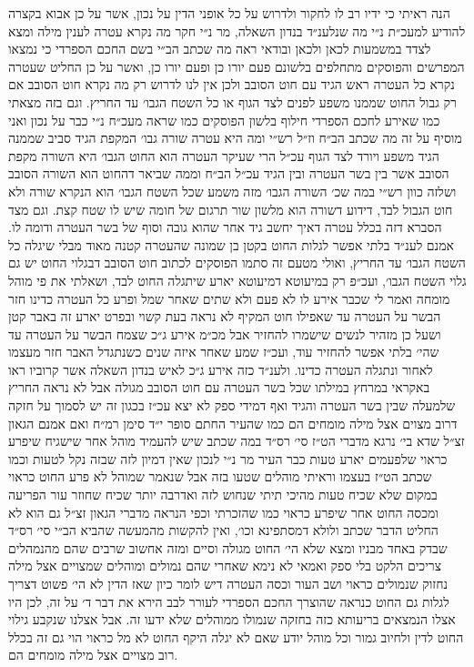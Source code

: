 \documentclass[12pt, openany]{book}
\begin{document}
\begin{multicols}{2}
הנה ראיתי כי ידיו רב לו לחקור ולדרוש על כל אופני הדין על נכון, אשר על כן אבוא בקצרה להודיע למעכ״ת נ״י מה שנלענ״ד בנדון השאלה, מר נ״י חקר מה נקרא עטרה לענין מילה ומצא לצדד במשמעות לכאן ולכאן ובודאי ראה מה שכתב הב״י בשם החכם הספרדי כי נמצאו המפרשים והפוסקים מתחלפים בלשונם פעם יורו כן ופעם יורו כן, ואשר על כן החליט שעטרה נקרא כל העטרה ראש הגיד עם חוט הסובב ולכן אין לנו לדרוש רק מה נקרא חוט הסובב אם רק גבול החוט שממנו משפע לפנים לצד הגוף או כל השטח הגבו׳ עד החריץ. וגם בזה מצאתי כמו שאירע לחכם הספרדי חילוף בלשון הפוסקים כמו שראה מעכ״ח נ״י כבר על נכון ואני מוסיף על זה מה שכתב הב״ח וז״ל רש״י ומה היא עטרה שורה גבו׳ המקפת הגיד סביב שממנה הגיד משפע ויורד לצד הגוף עכ״ל הרי שעיקר העטרה הוא החוט הגבו׳ היא השורה מקפת הסובב אשר בין בשר העטרה ובין הגיד עכ״ל הב״ח וממה שביאר דהחוט הוא השורה הסובב ושלזה כוון רש״י במה שכ׳ השורה הגבו׳ מזה משמע שכל השטח הגבו׳ הוא הנקרא שורה ולא חוט הגבול לבד, דידוע דשורה הוא מלשון שור תרגום של חומה שיש לו שטח קצת. וגם מצד הסברא דזה בכלל עטרה דאיך יחשב גיד אחר שהוא גובה וסוף של בשר העטרה ודומה לו. אמנם לענ״ד בלתי אפשר לגלות החוט בקטן בן שמונה שהעטרה קטנה מאוד מבלי שיגלה כל השטח הגבו׳ עד החריץ, ואולי מטעם זה סתמו הפוסקים לכתוב חוט הסובב דבגלוי החוט יש גם גלוי השטח הגבו׳, ועכ״פ רק במיעוטא דמיעוטא יארע שיתגלה החוט לבד, ושאלתי את פי מוהל מומחה ואמר לי שכבר אירע לו לא פעם ולא שתים שאחר שמל ופרע כל העטרה כדינו חזר הבשר על העטרה עד שאפילו חוט המקיף לא נראה בעת קשוי ובפרט יארע זה באבר קטן ושעל כן מזהיר לנשים שישמרו להחזיר אבל מכ״מ אירע ג״כ שצמח הבשר על העטרה עד שהי׳ בלתי אפשר להחזיר עוד, ועכ״ז שמע שאחר איזה שנים כשנתגדל האבר חזר מעצמו לאחור ונתגלה העטרה כדינו. ולענ״ד כזה אירע ג״כ לאיש בנדון השאלה אשר קרוביו ראו באקראי במרחץ במילתו שכל בשר העטרה עם חוט הסובב מגולה אבל לא נראה החריץ שלמעלה שבין בשר העטרה והגיד ואף דמידי ספק לא יצא עכ״ז בכגון זה יש לסמוך על חזקה דרוב מצוים אצל מילה מומחים הם כמו שהעיר החתם סופר י״ד סימן רמ״ח ואם אמנם הגאון זצ״ל שדא בי׳ נרגא מדברי הט״ז סי׳ רס״ד במה שכתב שיש להעמיד מוהל אחר שישגיח שיפרע כראוי שלפעמים יארע טעות כבר העיר מר נ״י לנכון שאין דמיון לזה שבזה נקל לטעות וכמו שכתב הט״ז בעצמו וראיתי מוהלים שטעו בזה אבל שנאמר שמוהל לא פרע החוט כראוי במקום שלא שכיח טעות מהיכי תיתי שנחוש לזה ואדרבה יותר שכיח שחוזר עור הפריעה ומכסה החוט אחר שיפרע כראוי כמו שהזכרתי וכפי הנראה מדברי הגאון זצ״ל גם הוא לא החליט הדבר שכתב ולולא דמסתפינא וכו׳, ואין להקשות מהמעשה שהביא הב״י סי׳ רס״ד שבדק באחד מבניו ומצא שלא הי׳ החוט מגולה וסיים ומזה אחשוב שרבים שהם מהנמהלים צריכים הלקט בלי ספק ואמאי לא נימא שאחרי שהם נמולים ומוהלים שמצויים אצל מילה נחזוק שנמולים כראוי ושב העור וכסה העטרה דיש לומר כיון שאז הדין לא הי׳ פשוט דצריך לגלות גם החוט כנראה שהוצרך החכם הספרדי לעורר לבב הירא את דבר ד׳ על זה, לכן היו אצלו הנמצאים בריעותא כזה בחזקה שנמולו ממוהלים שלא ידעו זה. אבל אצלנו שנקבע גילוי החוט לדין ולחיוב גמור וכל מוהל יודע שאם לא יגלה היקף החוט לא מל כראוי הוי גם זה בכלל רוב מצויים אצל מילה מומחים הם.\\\vspace{0pt}


\end{multicols}
\end{document}
